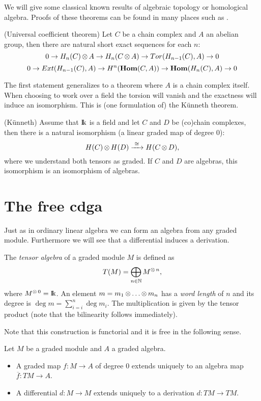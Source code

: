We will give some classical known results of algebraic topology or homological algebra. Proofs of these theorems can be found in many places such as \cite{rotman, weibel}.

\begin{theorem}
	(Universal coefficient theorem) Let $C$ be a chain complex and $A$ an abelian group, then there are natural short exact sequences for each $n$:
	$$ 0 \to H_n(C) \operatorname*{\otimes} A \to H_n(C \operatorname*{\otimes} A) \to Tor(H_{n-1}(C), A) \to 0 $$
	$$ 0 \to Ext(H_{n-1}(C), A) \to H^n(\mathbf{Hom}(C, A)) \to \mathbf{Hom}(H_n(C), A) \to 0 $$
\end{theorem}

The first statement generalizes to a theorem where $A$ is a chain complex itself. When choosing to work over a field the torsion will vanish and the exactness will induce an isomorphism. This is (one formulation of) the Künneth theorem.

\begin{theorem}
	(Künneth) Assume that $\mathrm{I\!k}$ is a field and let $C$ and $D$ be (co)chain complexes, then there is a natural isomorphism (a linear graded map of degree $0$):
	$$ H(C) \operatorname*{\otimes} H(D) \xrightarrow{\,\,{\cong}\,\,} H(C \operatorname*{\otimes} D), $$
	where we understand both tensors as graded. If $C$ and $D$ are algebras, this isomorphism is an isomorphism of algebras.
\end{theorem}


\section{The free cdga}
\label{sec:free-cdga}

Just as in ordinary linear algebra we can form an algebra from any graded module. Furthermore we will see that a differential induces a derivation.

\begin{definition}
	The \emph{tensor algebra} of a graded module $M$ is defined as
	$$ T(M) = \bigoplus_{n\in\mathbb{N}} M^{\operatorname*{\otimes} n}, $$
	where $M^{\operatorname*{\otimes} 0} = \mathrm{I\!k}$. An element $m = m_1 \operatorname*{\otimes} \ldots \operatorname*{\otimes} m_n$ has a \emph{word length} of $n$ and its degree is $\deg{m} = \sum_{i=i}^n \deg{m_i}$. The multiplication is given by the tensor product (note that the bilinearity follows immediately).
\end{definition}

Note that this construction is functorial and it is free in the following sense.

\begin{lemma}
	Let $M$ be a graded module and $A$ a graded algebra.
	\begin{itemize}
		\item A graded map $f: M \to A$ of degree $0$ extends uniquely to an algebra map $\overline{f} : TM \to A$.
		\item A differential $d: M \to M$ extends uniquely to a derivation $d: TM \to TM$.
	\end{itemize}
\end{lemma}

